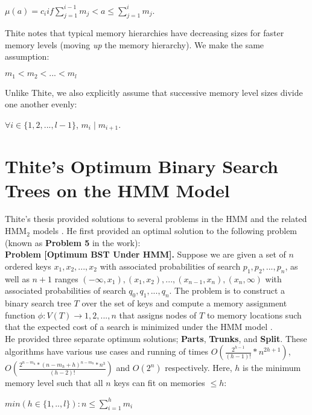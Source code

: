 \documentclass[letterpaper,12pt,titlepage,oneside,final]{book}
\theoremstyle{plain}
\begin{document}
\begin{center}$\mu (a) = c_i if \sum_{j = 1}^{i-1}m_j  < a \leq \sum_{j = 1}^{i}m_j$. \end{center}

Thite notes that typical memory hierarchies have decreasing sizes for faster memory levels (moving \textit{up} the memory hierarchy). We make the same assumption:
\begin{center}
$m_1 < m_2 < ... < m_l$
\end{center}
Unlike Thite, we also explicitly assume that successive memory level sizes divide one another evenly:
\begin{center}
$\forall i \in  \{1,2,...,l-1\}$, $m_i \mid m_{i+1}$.
\end{center}

\section{Thite's Optimum Binary Search Trees on the HMM Model}

Thite's thesis provided solutions to several problems in the HMM and the related HMM$_2$ models \cite{thite2008optimum}. He first provided an optimal solution to the following problem (known as \textbf{Problem 5} in the work):\\


\textbf{Problem [Optimum BST Under HMM].} Suppose we are given a set of $n$ ordered keys $x_1, x_2, ..., x_2$ with associated probabilities of search $p_1, p_2, ..., p_n$, as well as $n+1$ ranges $(- \infty, x_1), (x_1, x_2), ..., (x_{n-1}, x_n), (x_n, \infty)$ with associated probabilities of search $q_0, q_1, ..., q_n$. The problem is to construct a binary search tree $T$ over the set of keys and compute a memory assignment function $\phi : V (T) \rightarrow {1, 2, ..., n}$ that assigns nodes of $T$ to memory locations such that the expected cost of a search is minimized under the HMM model \cite{thite2008optimum}.\\


He provided three separate optimum solutions; \textbf{Parts}, \textbf{Trunks}, and \textbf{Split}. These algorithms have various use cases and running of times $O(\frac{2^{h-1}}{(h-1)!}* n^{2h+1})$, $O(\frac{2^{n-m_h}*(n-m_h+h)^{n-m_h}*n^3}{(h-2)!})$ and $O(2^n)$ respectively. Here, $h$ is the minimum memory level such that all $n$ keys can fit on memories $\leq h$: \\
\begin{center}
$min(h \in \{1,..,l\} ): n \leq \sum_{i = 1}^{h}m_i$
\end{center}
\end{document}
